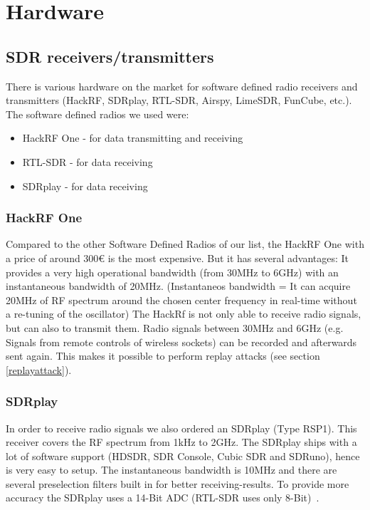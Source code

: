 \documentclass[conference]{IEEEtran}
\begin{document}
\section{Hardware}
\subsection{SDR receivers/transmitters}
There is various hardware on the market for software defined radio receivers and transmitters (HackRF, SDRplay, RTL-SDR, Airspy, LimeSDR, FunCube, etc.). The software defined radios we used were:
\begin{itemize}
	\item HackRF One - for data transmitting and receiving
	\item RTL-SDR - for data receiving
	\item SDRplay - for data receiving
\end{itemize}

\subsubsection{HackRF One}
Compared to the other Software Defined Radios of our list, the HackRF One with a price of around 300€ is the most expensive. But it has several advantages: It provides a very high operational bandwidth (from 30MHz to 6GHz) with an instantaneous bandwidth of 20MHz. (Instantaneos bandwidth = It can acquire 20MHz of RF spectrum around the chosen center frequency in real-time without a re-tuning of the oscillator) \cite{Mishra2014} The HackRf is not only able to receive radio signals, but can also to transmit them. Radio signals between 30MHz and 6GHz (e.g. Signals from remote controls of wireless sockets) can be recorded and afterwards sent again. This makes it possible to perform replay attacks (see section \ref{replayattack}).  \\

\subsubsection{SDRplay} \label{sec:SDRplay}
In order to receive radio signals we also ordered an SDRplay (Type RSP1). This receiver covers the RF spectrum from 1kHz to 2GHz. The SDRplay ships with  a lot of software support (HDSDR, SDR Console, Cubic SDR and SDRuno), hence is very easy to setup. The instantaneous bandwidth is 10MHz and there are several preselection filters built in for better receiving-results. To provide more accuracy the SDRplay uses a 14-Bit ADC (RTL-SDR uses only 8-Bit)~\cite{sdrplay}.
\end{document}
